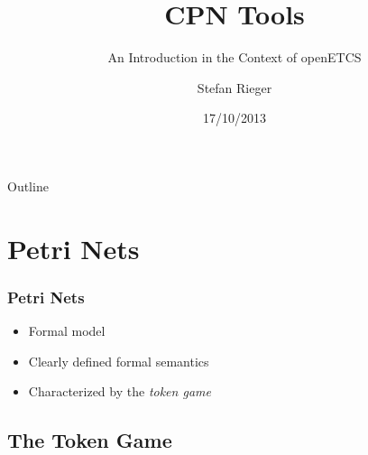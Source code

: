 \documentclass{beamer}
\title{CPN Tools}
\subtitle{An Introduction in the Context of openETCS}
\author{Stefan Rieger}
\institute{TWT GmbH Science \& Innovation\\~\\Stuttgart, Germany}
\date{17/10/2013}
\newenvironment{myitemize}{\begin{itemize}\addtolength{\itemsep}{2mm}}{\end{itemize}}
\begin{document}
\begin{frame}[plain]
  \titlepage
\end{frame}

\begin{frame}{Outline}
  \tableofcontents
\end{frame}

\section{Petri Nets}

\begin{frame}
\frametitle{Petri Nets}
\begin{myitemize}
  \item Formal model
  \item Clearly defined formal semantics
  \item Characterized by the \emph{token game}
\end{myitemize}
\end{frame}

\subsection{The Token Game}
\end{document}
